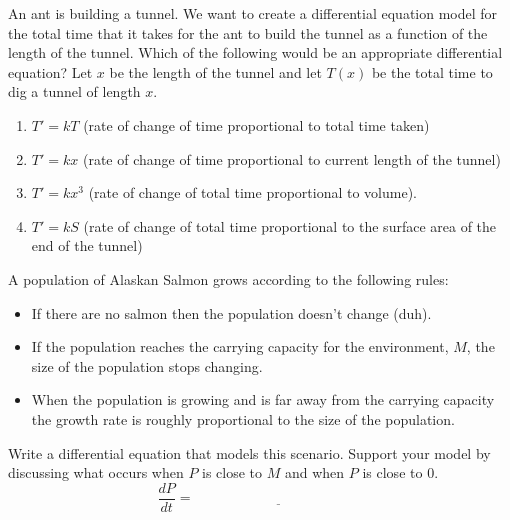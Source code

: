 \begin{problem}
An ant is building a tunnel.  We want to create a differential equation model for the
total time that it takes for the ant to build the tunnel as a function of the length of
the tunnel.  Which of the following would be an appropriate differential equation? Let $x$
be the length of the tunnel and let $T(x)$ be the total time to dig a tunnel of length
$x$.  
% 
\begin{enumerate}
    \item $T' = kT$ (rate of change of time proportional to total time taken)
    \item $T' = kx$ (rate of change of time proportional to current length of the tunnel)
    \item $T' = kx^3$ (rate of change of total time proportional to volume). 
    \item $T' = kS$ (rate of change of total time proportional to the surface area of the end of
the tunnel)
\end{enumerate}
\end{problem}



\begin{problem}
    A population of Alaskan Salmon grows according to the following rules:
    \begin{itemize}
        \item If there are no salmon then the population doesn't change (duh).
        \item If the population reaches the carrying capacity for the environment, $M$,
            the size of the population stops changing.
        \item When the population is growing and is far away from the carrying capacity
            the growth rate is roughly proportional to the size of the population.
    \end{itemize}
    Write a differential equation that models this scenario.  Support your model by
    discussing what occurs when $P$ is close to $M$ and when $P$ is close to $0$.
    \[ \frac{dP}{dt} = \underline{\hspace{2in}} \]
\end{problem}

